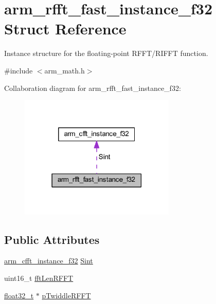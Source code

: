 \hypertarget{structarm__rfft__fast__instance__f32}{}\section{arm\+\_\+rfft\+\_\+fast\+\_\+instance\+\_\+f32 Struct Reference}
\label{structarm__rfft__fast__instance__f32}


Instance structure for the floating-\/point R\+F\+F\+T/\+R\+I\+F\+FT function.  




{\ttfamily \#include $<$arm\+\_\+math.\+h$>$}



Collaboration diagram for arm\+\_\+rfft\+\_\+fast\+\_\+instance\+\_\+f32\+:
\nopagebreak
\begin{figure}[H]
\begin{center}
\leavevmode
\includegraphics[width=210pt]{structarm__rfft__fast__instance__f32__coll__graph}
\end{center}
\end{figure}
\subsection*{Public Attributes}
\begin{DoxyCompactItemize}
\item 
\hyperlink{structarm__cfft__instance__f32}{arm\+\_\+cfft\+\_\+instance\+\_\+f32} \hyperlink{structarm__rfft__fast__instance__f32_a37419ababdfb3151b1891ae6bcd21012}{Sint}
\item 
uint16\+\_\+t \hyperlink{structarm__rfft__fast__instance__f32_aef06ab665041ec36f5b25d464f0cab14}{fft\+Len\+R\+F\+FT}
\item 
\hyperlink{arm__math_8h_a4611b605e45ab401f02cab15c5e38715}{float32\+\_\+t} $\ast$ \hyperlink{structarm__rfft__fast__instance__f32_a9f30b04f163fabc1b24421d3c323d5fc}{p\+Twiddle\+R\+F\+FT}
\end{DoxyCompactItemize}


